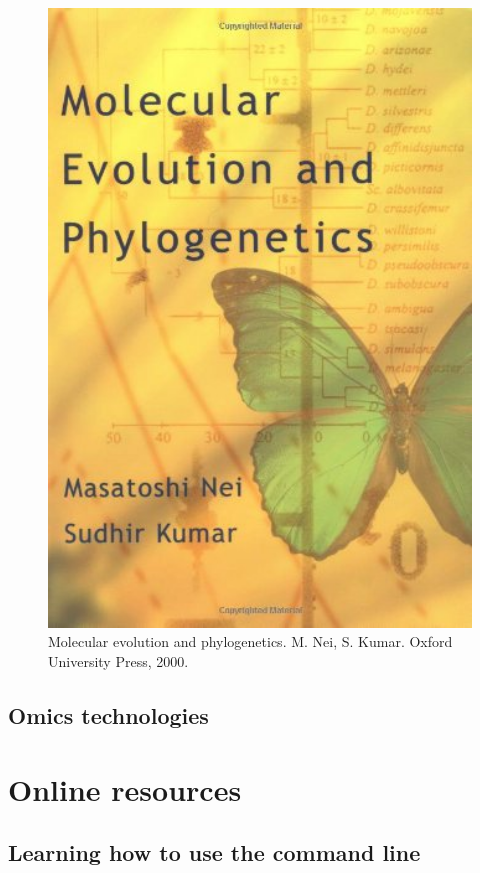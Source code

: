 \documentclass[]{book}
\theoremstyle{definition}
\theoremstyle{definition}
\theoremstyle{definition}
\theoremstyle{remark}
\begin{document}
\begin{figure}
\includegraphics[width=4.75in]{pic/phylogenetics_book} \caption{Molecular evolution and phylogenetics. M. Nei, S. Kumar. Oxford University Press, 2000.}\label{fig:unnamed-chunk-12}
\end{figure}

\subsection{Omics technologies}\label{omics-technologies}

\section{Online resources}\label{online-resources}

\subsection{Learning how to use the command
line}\label{learning-how-to-use-the-command-line}
\end{document}
